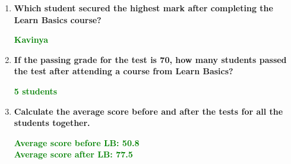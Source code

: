 \documentclass[a4paper,12pt]{article}
\newcommand{\answer}[1]{%
    \begin{center}
    \textcolor{green}{\textbf{#1}}\par
    \end{center}
}
\begin{document}
{\begin{minipage}{\dimexpr\textwidth-2\fboxsep-2\fboxrule\relax}
\begin{enumerate}
		\item \textbf{Which student secured the highest mark after completing the Learn Basics course?}\\
		\answer{Kavinya}
		
		\item \textbf{If the passing grade for the test is 70, how many students passed the test after attending a course from Learn Basics?}\\
		\answer{5 students}
		
		\item \textbf{Calculate the average score before and after the tests for all the students together.}\\
		\answer{Average score before LB: 50.8 \\ Average score after LB: 77.5}
	\end{enumerate}
    \end{minipage}
}
\end{document}
